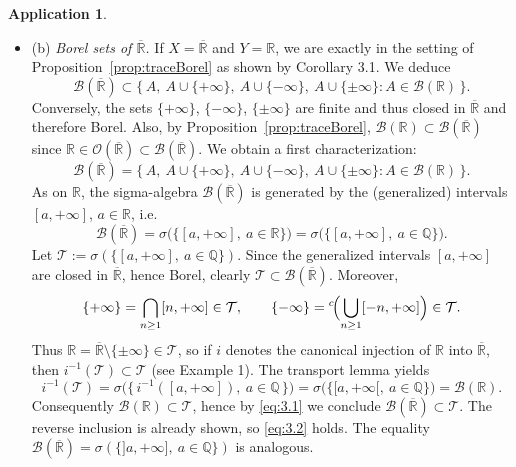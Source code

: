 \documentclass[12pt]{article}
\theoremstyle{definition}
\newtheorem{application}{Application}[section]
\begin{document}
\begin{application}
\begin{itemize}
\item (b) \emph{Borel sets of $\overline{\mathbb R}$.}
If $X=\overline{\mathbb R}$ and $Y=\mathbb R$, we are exactly in the setting of Proposition~\ref{prop:traceBorel} as shown by Corollary 3.1. We deduce
\[
\mathcal B(\overline{\mathbb R})\subset\{\,A,\ A\cup\{+\infty\},\ A\cup\{-\infty\},\ A\cup\{\pm\infty\}: A\in\mathcal B(\mathbb R)\,\}.
\]
Conversely, the sets $\{+\infty\}$, $\{-\infty\}$, $\{\pm\infty\}$ are finite and thus closed in $\overline{\mathbb R}$ and therefore Borel. Also, by Proposition~\ref{prop:traceBorel}, $\mathcal B(\mathbb R)\subset \mathcal B(\overline{\mathbb R})$ since $\mathbb R\in\mathcal O(\overline{\mathbb R})\subset\mathcal B(\overline{\mathbb R})$. We obtain a first characterization:
\begin{equation}\label{eq:3.1}
\mathcal B(\overline{\mathbb R})=\{\,A,\ A\cup\{+\infty\},\ A\cup\{-\infty\},\ A\cup\{\pm\infty\}: A\in\mathcal B(\mathbb R)\,\}.
\end{equation}
As on $\mathbb R$, the sigma-algebra $\mathcal B(\overline{\mathbb R})$ is generated by the (generalized) intervals $[a,+\infty]$, $a\in\mathbb R$, i.e.
\begin{equation}\label{eq:3.2}
\mathcal B(\overline{\mathbb R})=\sigma\bigl(\{[a,+\infty],\ a\in\mathbb R\}\bigr)=\sigma\bigl(\{[a,+\infty],\ a\in\mathbb Q\}\bigr).
\end{equation}
Let $\mathcal T:=\sigma(\{[a,+\infty],\ a\in\mathbb Q\})$. Since the generalized intervals $[a,+\infty]$ are closed in $\overline{\mathbb R}$, hence Borel, clearly $\mathcal T\subset\mathcal B(\overline{\mathbb R})$. Moreover,
\[
\{+\infty\}=\bigcap_{n\ge1} [n,+\infty]\in\mathcal T,
\qquad
\{-\infty\}={}^c\!\Bigl(\bigcup_{n\ge1}[-n,+\infty]\Bigr)\in\mathcal T.
\]
Thus $\mathbb R=\overline{\mathbb R}\setminus\{\pm\infty\}\in\mathcal T$, so if $i$ denotes the canonical injection of $\mathbb R$ into $\overline{\mathbb R}$, then $i^{-1}(\mathcal T)\subset\mathcal T$ (see Example 1). The transport lemma yields
\[
i^{-1}(\mathcal T)
= \sigma\bigl(\{\,i^{-1}([a,+\infty]),\ a\in\mathbb Q\,\}\bigr)
= \sigma\bigl(\{[a,+\infty[,\ a\in\mathbb Q\}\bigr)
= \mathcal B(\mathbb R).
\]
Consequently $\mathcal B(\mathbb R)\subset\mathcal T$, hence by \eqref{eq:3.1} we conclude $\mathcal B(\overline{\mathbb R})\subset\mathcal T$. The reverse inclusion is already shown, so \eqref{eq:3.2} holds. The equality $\mathcal B(\overline{\mathbb R})=\sigma(\{]a,+\infty],\ a\in\mathbb Q\})$ is analogous.
\end{itemize}
\end{application}
\end{document}
